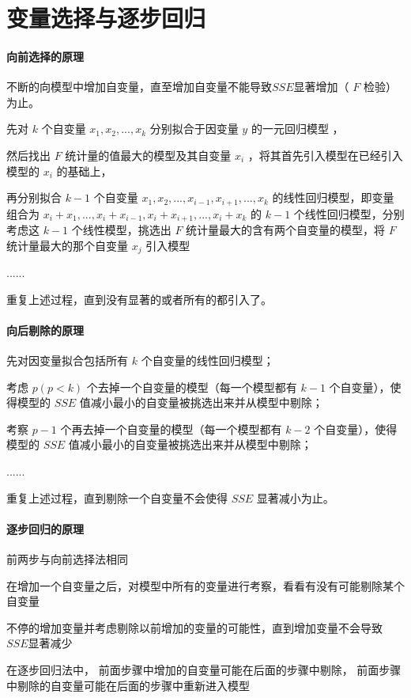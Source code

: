 \documentclass[UTF8,10pt]{book}
\begin{document}
{\section{变量选择与逐步回归}

\paragraph{向前选择的原理}	不断的向模型中增加自变量，直至增加自变量不能导致$SSE$显著增加（ $F$ 检验）为止。 

先对 $k$ 个自变量 $ x_1,x_2,...,x_k$ 分别拟合于因变量 $y$ 的一元回归模型 ，

然后找出 $F$ 统计量的值最大的模型及其自变量 $x_i$ ，将其首先引入模型在已经引入模型的 $x_i$ 的基础上，

再分别拟合 $k-1$ 个自变量 $ x_1,x_2,...,x_{i-1},x_{i+1},...,x_{k}$ 的线性回归模型，即变量组合为 $x_i + x_1,...,x_i + x_{i-1},x_i + x_{i+1},...,x_i + x_{k}$ 的 $k-1$ 个线性回归模型，分别考虑这 $k-1$ 个线性模型，挑选出 $F$ 统计量最大的含有两个自变量的模型，将 $F$ 统计量最大的那个自变量 $x_j $ 引入模型

......

重复上述过程，直到没有显著的或者所有的都引入了。

\paragraph{向后剔除的原理}	先对因变量拟合包括所有 $k$ 个自变量的线性回归模型；

考虑 $p(p<k)$ 个去掉一个自变量的模型（每一个模型都有 $k-1$ 个自变量），使得模型的 $SSE$ 值减小最小的自变量被挑选出来并从模型中剔除；

考察 $p-1$ 个再去掉一个自变量的模型（每一个模型都有 $k-2$ 个自变量），使得模型的 $SSE$ 值减小最小的自变量被挑选出来并从模型中剔除；

......

重复上述过程，直到剔除一个自变量不会使得 $SSE$ 显著减小为止。

\paragraph{逐步回归的原理}	前两步与向前选择法相同

在增加一个自变量之后，对模型中所有的变量进行考察，看看有没有可能剔除某个自变量 

不停的增加变量并考虑剔除以前增加的变量的可能性，直到增加变量不会导致 $SSE$显著减少 

在逐步回归法中， 前面步骤中增加的自变量可能在后面的步骤中剔除， 前面步骤中剔除的自变量可能在后面的步骤中重新进入模型

}
\end{document}
